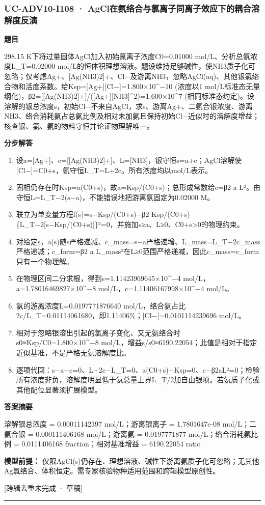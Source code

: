 \documentclass[UTF8,11pt,a4paper]{ctexart}
\begin{document}
\subsubsection*{UC-ADV10-I108 · AgCl在氨络合与氯离子同离子效应下的耦合溶解度反演}
\noindent\textbf{题目}\par
298.15 K下将过量固体AgCl加入初始氯离子浓度C0=0.01000 mol/L、分析总氨浓度L\_T=0.02000 mol/L的恒体积理想溶液。题设维持足够碱性，使NH3质子化可忽略；仅考虑Ag+、[Ag(NH3)2]+、Cl−及游离NH3，忽略AgCl(aq)、其他银氯络合物和活度系数。给Ksp=[Ag+][Cl−]=1.800×10\textasciicircum{}−10 (浓度以1 mol/L标准态无量纲化)，β2=[[Ag(NH3)2]+]/([Ag+][NH3]\textasciicircum{}2)=1.600×10\textasciicircum{}7 (相同标准态约定)。设溶解的银总浓度s，初始Cl−不来自AgCl，求s、游离Ag+、二氨合银浓度、游离NH3、络合消耗氨占总氨比例及相对未加氨且保持初始Cl−近似时的溶解度增益；核查银、氯、氨的物料守恒并论证物理解唯一。\par
\medskip\noindent\textbf{分步解答}
\begin{enumerate}
\item 设a=[Ag+]、c=[[Ag(NH3)2]+]、L=[NH3]，银守恒s=a+c；AgCl溶解使[Cl−]=C0+s，氨守恒L\_T=L+2c。所有浓度均以mol/L表示。
\item 固相仍存在时Ksp=a(C0+s)，故a=Ksp/(C0+s)；总形成常数给c=β2 a L²。由守恒L=L\_T−2(s−a)，不能错误地把游离氨固定为0.02000 M。
\item 联立为单变量方程f(s)=s−Ksp/(C0+s)−β2 Ksp/(C0+s)\{L\_T−2[s−Ksp/(C0+s)]\}²=0，并施加s≥a、L≥0、C0+s>0的物理约束。
\item 对给定s，a(s)随s严格递减、c\_mass=s−a严格递增、L\_mass=L\_T−2c\_mass严格递减；c\_form=β2 a L\_mass²在L≥0范围严格递减，因此c\_mass=c\_form只有一个物理解。
\item 在物理区间二分求根，得到s=1.11423969645×10\textasciicircum{}−4 mol/L，a=1.78016469827×10\textasciicircum{}−8 mol/L，c=1.11406167998×10\textasciicircum{}−4 mol/L。
\item 氨的游离浓度L=0.0197771876640 mol/L，络合氨占比2c/L\_T=0.01114061680，即1.11406\%；[Cl−]=0.0101114239696 mol/L。
\item 相对于忽略银溶出引起的氯离子变化、又无氨络合时s0≈Ksp/C0=1.800×10\textasciicircum{}−8 mol/L，增益s/s0≈6190.22054；此值是相对于指定近似基准，不是严格无氨溶解度比。
\item 逐项代回：s−a−c=0、L+2c−L\_T=0、a(C0+s)−Ksp=0、c−β2aL²=0；检验所有浓度非负，溶解度明显低于氨总量上界L\_T/2加自由银项。若氨质子化或其他配位显著须扩展模型。
\end{enumerate}
\noindent\textbf{答案摘要}\par
溶解银总浓度 = 0.00011142397 mol/L；游离银离子 = 1.7801647e-08 mol/L；二氨合银 = 0.000111406168 mol/L；游离氨 = 0.0197771877 mol/L；络合消耗氨比例 = 0.0111406168 fraction；相对基准增益 = 6190.22054 ratio\par
\noindent\textbf{模型前提：}
仅限AgCl(s)仍存在、理想溶液、碱性下游离氨质子化可忽略；无其他Ag氯络合、体积恒定。需专家核验物种适用范围和跨辑模型原创性。\par
\noindent\textcolor{red!65!black}{[跨辑去重未完成 · 草稿]} \par
\medskip\hrule\medskip
{}
\end{document}
